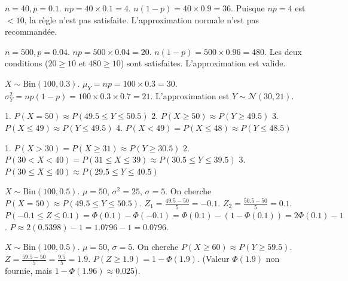 \begin{correctionbox}
$n=40, p=0.1$.
$np = 40 \times 0.1 = 4$.
$n(1-p) = 40 \times 0.9 = 36$.
Puisque $np=4$ est $< 10$, la règle n'est pas satisfaite. L'approximation normale n'est pas recommandée.
\end{correctionbox}

\begin{correctionbox}
$n=500, p=0.04$.
$np = 500 \times 0.04 = 20$.
$n(1-p) = 500 \times 0.96 = 480$.
Les deux conditions ($20 \ge 10$ et $480 \ge 10$) sont satisfaites. L'approximation est valide.
\end{correctionbox}

\begin{correctionbox}
$X \sim \text{Bin}(100, 0.3)$.
$\mu_Y = np = 100 \times 0.3 = 30$.
$\sigma_Y^2 = np(1-p) = 100 \times 0.3 \times 0.7 = 21$.
L'approximation est $Y \sim \mathcal{N}(30, 21)$.
\end{correctionbox}

\begin{correctionbox}
1. $P(X = 50) \approx P(49.5 \le Y \le 50.5)$
2. $P(X \ge 50) \approx P(Y \ge 49.5)$
3. $P(X \le 49) \approx P(Y \le 49.5)$
4. $P(X < 49) = P(X \le 48) \approx P(Y \le 48.5)$
\end{correctionbox}

\begin{correctionbox}
1. $P(X > 30) = P(X \ge 31) \approx P(Y \ge 30.5)$
2. $P(30 < X < 40) = P(31 \le X \le 39) \approx P(30.5 \le Y \le 39.5)$
3. $P(30 \le X \le 40) \approx P(29.5 \le Y \le 40.5)$
\end{correctionbox}

\begin{correctionbox}[Correction Exercice 17 : Binomiale (Calcul P(X=k))]
$X \sim \text{Bin}(100, 0.5)$. $\mu = 50$, $\sigma^2 = 25$, $\sigma = 5$.
On cherche $P(X=50) \approx P(49.5 \le Y \le 50.5)$.
$Z_1 = \frac{49.5 - 50}{5} = -0.1$. $Z_2 = \frac{50.5 - 50}{5} = 0.1$.
$P(-0.1 \le Z \le 0.1) = \Phi(0.1) - \Phi(-0.1) = \Phi(0.1) - (1 - \Phi(0.1)) = 2\Phi(0.1) - 1$.
$P \approx 2(0.5398) - 1 = 1.0796 - 1 = 0.0796$.
\end{correctionbox}

\begin{correctionbox}
$X \sim \text{Bin}(100, 0.5)$. $\mu = 50$, $\sigma = 5$.
On cherche $P(X \ge 60) \approx P(Y \ge 59.5)$.
$Z = \frac{59.5 - 50}{5} = \frac{9.5}{5} = 1.9$.
$P(Z \ge 1.9) = 1 - \Phi(1.9)$. (Valeur $\Phi(1.9)$ non fournie, mais $1-\Phi(1.96) \approx 0.025$).
\end{correctionbox}


